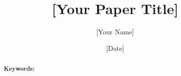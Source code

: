\documentclass[12pt,a4paper]{article}
\title{[Your Paper Title]}
\author{[Your Name]\\[Your Institution]}
\date{[Date]}
\theoremstyle{definition}
\theoremstyle{remark}
\begin{document}
\maketitle

\begin{abstract}

\textbf{Keywords:} 
\end{abstract}

% 
% 
% 
% 
% 

% 
% 

\end{document}
